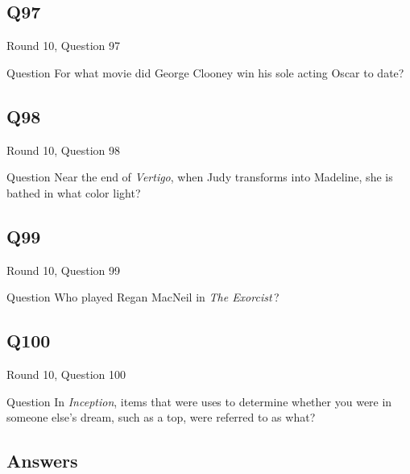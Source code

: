 \documentclass[11pt]{beamer}
\begin{document}
\subsection*{Q97}
\begin{frame}[t]{Round 10, Question 97}
\vspace{2em}
\begin{block}{Question}
For what movie did George Clooney win his sole acting Oscar to date?
\end{block}
\end{frame}
    

\subsection*{Q98}
\begin{frame}[t]{Round 10, Question 98}
\vspace{2em}
\begin{block}{Question}
Near the end of \emph{Vertigo}, when Judy transforms into Madeline, she is bathed in what color light?
\end{block}
\end{frame}
    

\subsection*{Q99}
\begin{frame}[t]{Round 10, Question 99}
\vspace{2em}
\begin{block}{Question}
Who played Regan MacNeil in \emph{The Exorcist}\,?
\end{block}
\end{frame}
    

\subsection*{Q100}
\begin{frame}[t]{Round 10, Question 100}
\vspace{2em}
\begin{block}{Question}
In \emph{Inception}, items that were uses to determine whether you were in someone else's dream, such as a top, were referred to as what?
\end{block}
\end{frame}
    
\subsection{Answers}
\end{document}

